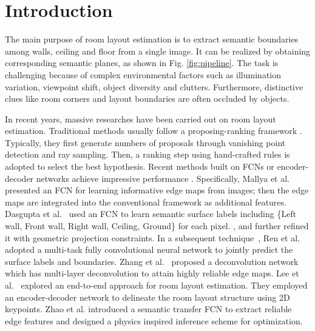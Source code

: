 \section{Introduction}
\label{sec:intro}

The main purpose of room layout estimation is to extract semantic boundaries among walls, ceiling and floor from a single image. It can be realized by obtaining corresponding semantic planes, as shown in Fig. \ref{fig:pipeline}. The task is challenging because of complex environmental factors such as illumination variation, viewpoint shift, object diversity and clutters. Furthermore, distinctive clues like room corners and layout boundaries are often occluded by objects. 

In recent years, massive researches have been carried out on room layout estimation. Traditional methods usually follow a proposing-ranking framework \cite{hedau2009recovering,wang2013discriminative,gupta2010estimating,hedau2010thinking}. Typically, they first generate numbers of proposals through vanishing point detection and ray sampling. Then, a ranking step using hand-crafted rules is adopted to select the best hypothesis. Recent methods built on FCNs \cite{long2015fully} or encoder-decoder networks achieve impressive performance \cite{mallya2015learning,ren2016coarse,zhang2017learning,dasgupta2016delay,LeeRoomNet17,zhao2017physics}. 
Specifically, Mallya et al.~\cite{mallya2015learning} presented an FCN for learning informative edge maps from images;  then the edge maps are integrated into the conventional framework as additional features. 
%
Dasgupta et al.~\cite{dasgupta2016delay} used an FCN to learn semantic surface labels including \{Left wall, Front wall, Right wall, Ceiling, Ground\} for each pixel. , and further refined it with geometric projection constraints.
% 
In a subsequent technique~\cite{ren2016coarse}, Ren et al. adopted a multi-task fully convolutional neural network to jointly predict the surface labels and boundaries. 
%
Zhang et al.~\cite{zhang2017learning} proposed a deconvolution network which has multi-layer deconvolution to attain highly reliable edge maps. 
%
Lee et al.~\cite{LeeRoomNet17} explored an end-to-end approach for room layout estimation. They employed an encoder-decoder network to delineate the room layout structure using 2D keypoints.
%
Zhao et al. \cite{zhao2017physics} introduced a semantic transfer FCN to extract reliable edge features and designed a physics inspired inference scheme for optimization.


